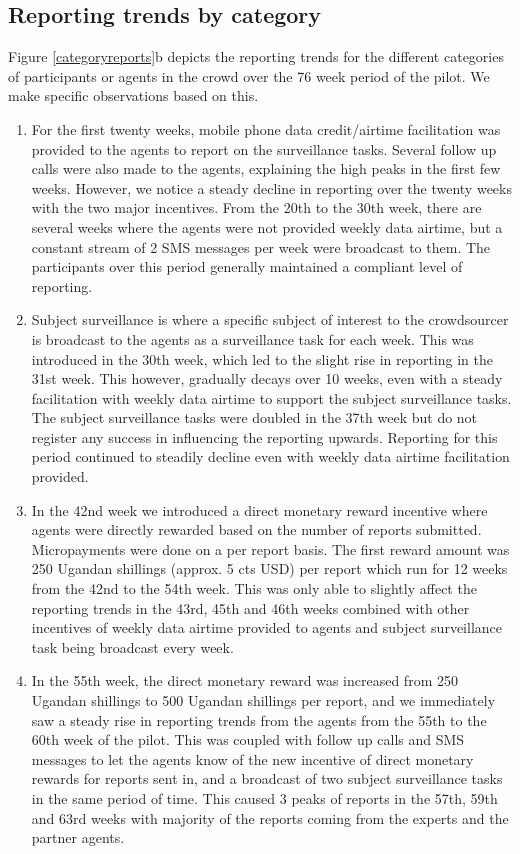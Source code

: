 \documentclass[letterpaper]{article} %
\begin{document}
\subsection{Reporting trends by category}
Figure \ref{categoryreports}b depicts the reporting trends for the different categories of participants or agents in the crowd over the 76 week period of the pilot. We make specific observations based on this.
\begin{enumerate}[-]
\item For the first twenty weeks, mobile phone data credit/airtime facilitation was provided to the agents to report on the surveillance tasks. Several follow up calls were also made to the agents, explaining the high peaks in the first few weeks. However, we notice a steady decline in reporting over the twenty weeks with the two major incentives. From the 20th to the 30th week, there are several weeks where the agents were not provided weekly data airtime, but a constant stream of 2 SMS messages per week were broadcast to them. The participants over this period generally maintained a compliant level of reporting.
\item Subject surveillance is where a specific subject of interest to the crowdsourcer is broadcast to the agents as a surveillance task for each week.
This was introduced in the 30th week, which led to the slight rise in reporting in the 31st week. This however, gradually decays over 10 weeks, even with a steady facilitation with weekly data airtime to support the subject surveillance tasks. The subject surveillance tasks were doubled in the 37th week but do not register any success in influencing the reporting upwards. Reporting for this period continued to steadily decline even with weekly data airtime facilitation provided.
\item In the 42nd week we introduced a direct monetary reward incentive where agents were directly rewarded based on the number of reports submitted. Micropayments were done on a per report basis. The first reward amount was 250 Ugandan shillings (approx. 5 cts USD) per report which run for 12 weeks from the 42nd to the 54th week. This was only able to slightly affect the reporting trends in the 43rd, 45th and 46th weeks combined with other incentives of weekly data airtime provided to agents and subject surveillance task being broadcast every week.
\item In the 55th week, the direct monetary reward was increased from 250 Ugandan shillings to 500 Ugandan shillings per report, and we immediately saw a steady rise in reporting trends from the agents from the 55th to the 60th week of the pilot. This was coupled with follow up calls and SMS messages to let the agents know of the new incentive of direct monetary rewards for reports sent in, and a broadcast of two subject surveillance tasks in the same period of time. This caused 3 peaks of reports in the 57th, 59th and 63rd weeks with majority of the reports coming from the experts and the partner agents.

\end{enumerate}
\end{document}
